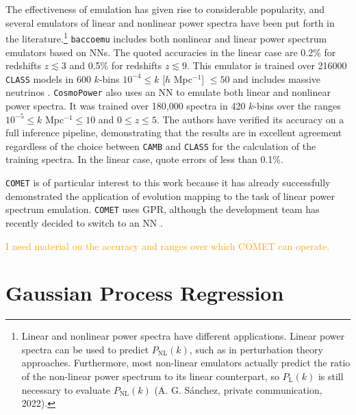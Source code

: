 The effectiveness of emulation has given rise to considerable popularity, and
several emulators of linear and nonlinear power spectra have been put 
forth in the literature.\footnote{Linear and nonlinear power spectra have 
different
applications. Linear power spectra can be used to predict $P_\text{NL}(k)$, 
such as in perturbation theory approaches. Furthermore, most non-linear 
emulators actually predict the ratio of the non-linear power spectrum to its 
linear counterpart, so $P_\text{L}(k)$ is still necessary to evaluate
$P_\text{NL}(k)$ (A. G. S\'{a}nchez, private communication, 2022).}
\verb|baccoemu| includes both nonlinear and linear power spectrum emulators 
based on NNs. The quoted accuracies in the linear case are
0.2\% for redshifts $z \lesssim 3$ and
0.5\% for redshifts $z \lesssim 9$. This emulator is trained over 216000
\verb|CLASS|
models in 600 $k$-bins $10^{-4} \leq k$ [$h$ Mpc$^{-1}$] $\leq 50$ and 
includes massive neutrinos . \verb|CosmoPower| also uses an NN
to emulate both linear and nonlinear power spectra. It was trained over
180,000 spectra in 420 $k$-bins over the ranges
$10^{-5} \leq k $ Mpc$^{-1} \leq 10$ and 
$0 \leq z \leq 5$. The authors have verified
its accuracy on a full inference pipeline, demonstrating that the results
are in excellent agreement regardless of the choice between \verb|CAMB| and
\verb|CLASS| for the calculation of the training spectra. In the linear case,
\citet{Mancini} quote errors of less than 0.1\%. 

\verb|COMET| is of particular interest to this work because it has already
successfully demonstrated the application of evolution mapping to the task of
linear power spectrum emulation. \verb|COMET| uses GPR, although the development team
has recently decided to switch to an NN .

\textcolor{orange}{I need material on the accuracy and ranges over which
COMET can operate.}



\section{Gaussian Process Regression}
\label{sec: gpr_intro}

